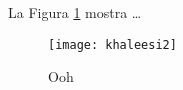\documentclass{article}
\begin{document}
La Figura \ref{fig:khal} mostra \dots

\begin{figure}
    \centering
    \texttt{[image: khaleesi2]}
    \caption{Ooh }
    \label{fig:khal}
\end{figure}
\end{document}

